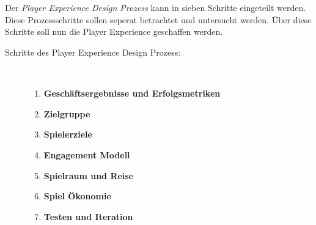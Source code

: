\documentclass[a4paper,12pt]{scrartcl}
\begin{document}
\\\\
Der \textit{Player Experience Design Prozess} kann in sieben Schritte eingeteilt werden. Diese Prozessschritte sollen seperat betrachtet und untersucht werden. Über diese Schritte soll nun die Player Experience geschaffen werden.
\begin{description}
   \item[Schritte des Player Experience Design Prozess:]~\par
   \begin{enumerate}
      \item \textbf{Geschäftsergebnisse und Erfolgsmetriken}
      \item \textbf{Zielgruppe}
      \item \textbf{Spielerziele}
      \item \textbf{Engagement Modell}
      \item \textbf{Spielraum und Reise}
      \item \textbf{Spiel Ökonomie}
      \item \textbf{Testen und Iteration}
   \end{enumerate}
\end{description}
\end{document}
